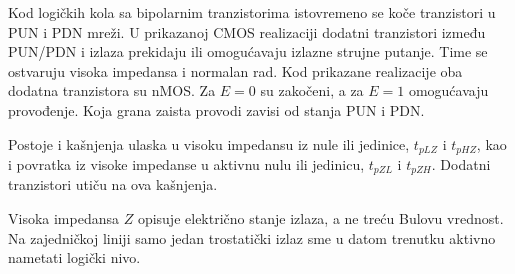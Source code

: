 Kod logičkih kola sa bipolarnim tranzistorima istovremeno se koče tranzistori u PUN i PDN mreži. U prikazanoj CMOS realizaciji dodatni tranzistori između PUN/PDN i izlaza prekidaju ili omogućavaju izlazne strujne putanje. Time se ostvaruju visoka impedansa i normalan rad. Kod prikazane realizacije oba dodatna tranzistora su nMOS. Za $E=0$ su zakočeni, a za $E=1$ omogućavaju provođenje. Koja grana zaista provodi zavisi od stanja PUN i PDN.

Postoje i kašnjenja ulaska u visoku impedansu iz nule ili jedinice, $t_{pLZ}$ i $t_{pHZ}$, kao i povratka iz visoke impedanse u aktivnu nulu ili jedinicu, $t_{pZL}$ i $t_{pZH}$. Dodatni tranzistori utiču na ova kašnjenja.

Visoka impedansa $Z$ opisuje električno stanje izlaza, a ne treću Bulovu vrednost. Na zajedničkoj liniji samo jedan trostatički izlaz sme u datom trenutku aktivno nametati logički nivo.
